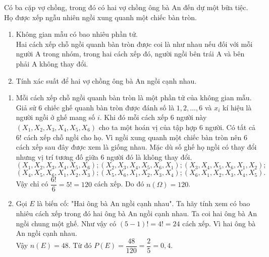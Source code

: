 \begin{bt}%
	Có ba cặp vợ chồng, trong đó có hai vợ chồng ông bà An đến dự một bữa tiệc. Họ được xếp ngẫu nhiên ngồi xung quanh một chiếc bàn tròn.
	\begin{enumerate}
		\item Không gian mẫu có bao nhiêu phần tử.\\
		Hai cách xếp chỗ ngồi quanh bàn tròn được coi là như nhau nếu đối với mỗi người A trong nhóm, trong hai cách xếp đó, người ngồi bên trái A và bên phải A không thay đổi.
		\item Tính xác suất để hai vợ chồng ông bà An ngồi cạnh nhau.
	\end{enumerate}
	\loigiai
	{
		\begin{enumerate}
			\item Mỗi cách xếp chỗ ngồi quanh bàn tròn là một phần tử của không gian mẫu. Giả sử $6$ chiếc ghế quanh bàn tròn được đánh số là $1{,}2,\ldots, 6$ và $x_i$ kí hiệu là người ngồi ở ghế mang số $i$. Khi đó mỗi cách xếp $6$ người này $\left(X_{1}, X_{2}, X_{3}, X_{4}, X_{5}, X_{6}\right)$ cho ta một hoán vị của tập hợp $6$ người. Có tất cả $6!$ cách xếp chỗ ngồi cho họ. Vì ngồi xung quanh một chiếc bàn tròn nên $6$ cách xếp sau đây được xem là giống nhau. Mặc dù số ghế họ ngồi có thay đổi nhưng vị trí tương đố giữa $6$ người đó là không thay đổi.
			\[\left(X_{1}, X_{2}, X_{3}, X_{4}, X_{5}, X_{6}\right) ;\left(X_{2}, X_{3}, X_{4}, X_{5}, X_{6}, X_{1}\right) ;\left(X_{3}, X_{4}, X_{5}, X_{6}, X_{1}, X_{2}\right);\]
			\[\left(X_{4}, X_{5}, X_{6}, X_{1}, X_{2}, X_{3}\right) ;\left(X_{5}, X_{6}, X_{1}, X_{2}, X_{3}, X_{4}\right) ;\left(X_{6}, X_{1}, X_{2}, X_{3}, X_{4}, X_{5}\right).\]
			Vậy chỉ có $\dfrac{6 !}{6}=5 !=120$ cách xếp. Do đó $n(\Omega)=120$.
			\item Gọi $E$ là biến cố: "Hai ông bà An ngồi cạnh nhau". Ta hãy tính xem có bao nhiêu cách xếp trong đó hai ông bà An ngồi cạnh nhau. Ta coi hai ông bà An ngồi chung một ghế. Như vậy có $(5-1) !=4 !=24$ cách xếp. Vì hai ông bà An ngồi cạnh nhau.\\
			Vậy $n(E)=48$. Từ đó $P(E)=\dfrac{48}{120}=\dfrac{2}{5}=0{,}4$.
		\end{enumerate}		
	}	
\end{bt}
